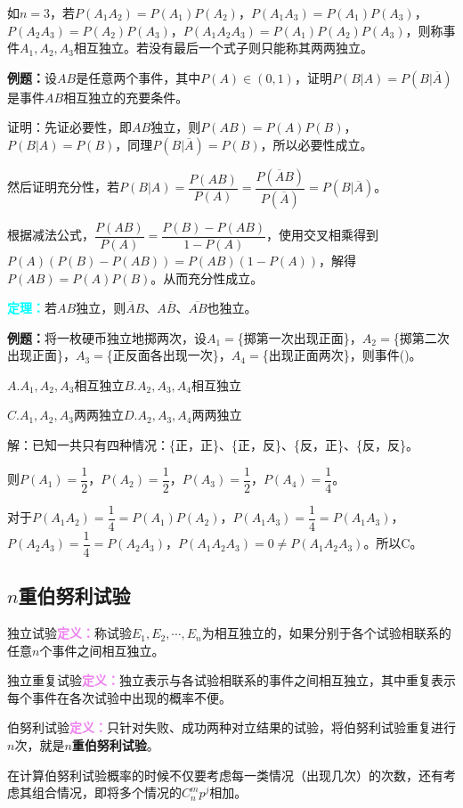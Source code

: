 如$n=3$，若$P(A_1A_2)=P(A_1)P(A_2)$，$P(A_1A_3)=P(A_1)P(A_3)$，$P(A_2A_3)=P(A_2)P(A_3)$，$P(A_1A_2A_3)=P(A_1)P(A_2)P(A_3)$，则称事件$A_1,A_2,A_3$相互独立。若没有最后一个式子则只能称其两两独立。

\textbf{例题：}设$AB$是任意两个事件，其中$P(A)\in(0,1)$，证明$P(B|A)=P(B|\overline{A})$是事件$AB$相互独立的充要条件。

证明：先证必要性，即$AB$独立，则$P(AB)=P(A)P(B)$，$P(B|A)=P(B)$，同理$P(B|\overline{A})=P(B)$，所以必要性成立。

然后证明充分性，若$P(B|A)=\dfrac{P(AB)}{P(A)}=\dfrac{P(\overline{A}B)}{P(\overline{A})}=P(B|\overline{A})$。

根据减法公式，$\dfrac{P(AB)}{P(A)}=\dfrac{P(B)-P(AB)}{1-P(A)}$，使用交叉相乘得到$P(A)(P(B)-P(AB))=P(AB)(1-P(A))$，解得$P(AB)=P(A)P(B)$。从而充分性成立。

\textcolor{aqua}{\textbf{定理：}}若$AB$独立，则$\overline{A}B$、$A\overline{B}$、$\overline{AB}$也独立。

\textbf{例题：}将一枚硬币独立地掷两次，设$A_1=$\{掷第一次出现正面\}，$A_2=$\{掷第二次出现正面\}，$A_3=$\{正反面各出现一次\}，$A_4=$\{出现正面两次\}，则事件()。

$A.A_1,A_2,A_3$相互独立\qquad$B.A_2,A_3,A_4$相互独立

$C.A_1,A_2,A_3$两两独立\qquad$D.A_2,A_3,A_4$两两独立

解：已知一共只有四种情况：\{正，正\}、\{正，反\}、\{反，正\}、\{反，反\}。

则$P(A_1)=\dfrac{1}{2}$，$P(A_2)=\dfrac{1}{2}$，$P(A_3)=\dfrac{1}{2}$，$P(A_4)=\dfrac{1}{4}$。

对于$P(A_1A_2)=\dfrac{1}{4}=P(A_1)P(A_2)$，$P(A_1A_3)=\dfrac{1}{4}=P(A_1A_3)$，$P(A_2A_3)=\dfrac{1}{4}=P(A_2A_3)$，$P(A_1A_2A_3)=0\neq P(A_1A_2A_3)$。所以C。

\subsection{\texorpdfstring{$n$重伯努利试验}{}}

独立试验\textcolor{violet}{\textbf{定义：}}称试验$E_1,E_2,\cdots,E_n$为相互独立的，如果分别于各个试验相联系的任意$n$个事件之间相互独立。

独立重复试验\textcolor{violet}{\textbf{定义：}}独立表示与各试验相联系的事件之间相互独立，其中重复表示每个事件在各次试验中出现的概率不便。

伯努利试验\textcolor{violet}{\textbf{定义：}}只针对失败、成功两种对立结果的试验，将伯努利试验重复进行$n$次，就是\textbf{$n$重伯努利试验}。

在计算伯努利试验概率的时候不仅要考虑每一类情况（出现几次）的次数，还有考虑其组合情况，即将多个情况的$C_n^mp^j$相加。

%
